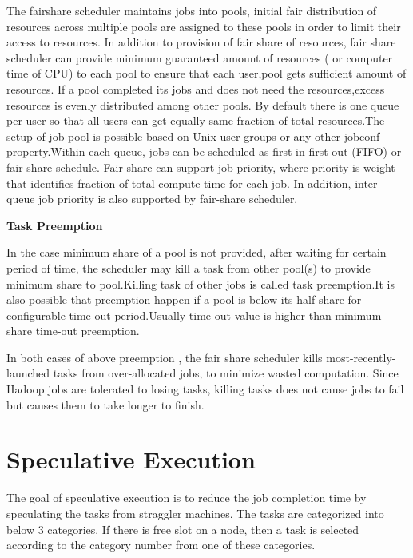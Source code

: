  
The fairshare scheduler maintains jobs into pools, initial fair distribution of resources across multiple pools are assigned to these pools in order to limit their access to resources. In addition to provision of fair share of resources, fair share scheduler can provide minimum guaranteed amount of resources ( or computer time of CPU) to each pool to ensure that each user,pool gets sufficient amount of resources. If a pool completed its jobs and does not need the resources,excess resources is evenly distributed among other pools.\cite{fair}
 By default there is one queue per user so that all users can get equally same fraction of total resources.The setup of job pool is possible based on Unix user groups or any other jobconf property.Within each queue, jobs can be scheduled as first-in-first-out (FIFO) or fair share schedule. Fair-share can support job priority, where priority is weight that identifies fraction of total compute time for each job. In addition,  inter-queue job priority is also supported by fair-share scheduler.\cite{fair}
 
 
 \textbf{Task Preemption}
 
 In the case minimum share of a pool is not provided, after waiting for certain period of time, the scheduler may kill a task from other pool(s) to provide minimum share to pool.Killing task of other jobs is called task preemption.It is also possible that preemption happen if a pool is below its half share for configurable time-out period.Usually time-out value is higher than minimum share time-out preemption.\cite{fair} 
 
In both cases of above preemption , the fair share scheduler kills most-recently-launched tasks from over-allocated jobs, to minimize wasted computation. Since Hadoop jobs are tolerated to losing tasks, killing tasks does not cause jobs to fail but causes them to take longer to finish.\cite{fair}
 














\section{Speculative Execution}

The goal of speculative execution is to reduce the job completion time by speculating the tasks from straggler machines. The tasks are categorized into below 3 categories. If there is free slot on a node, then a task is selected according to the category number from one of these categories.  


